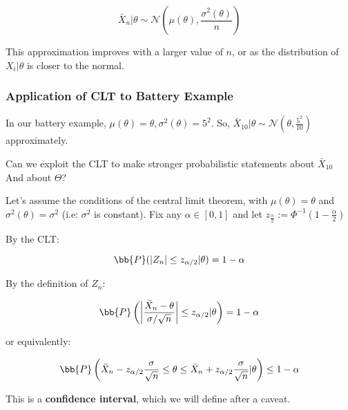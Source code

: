 \documentclass[a4paper]{article}
\begin{document}
                \[
                    \bar X_n | \theta \sim \mathcal{N}\left(\mu(\theta),
                    \frac{\sigma^2(\theta)}{n}\right)
                \]

                This approximation improves with a larger value of $n$, or as
                the distribution of $X_i | \theta$ is closer to the normal.

            \subsubsection{Application of CLT to Battery Example}
                In our battery example, $\mu(\theta) = \theta, \sigma^2(\theta)
                = 5^2$. So, $\bar X_{10} | \theta \sim \mathcal{N}\left(\theta,
                \frac{5^2}{10}\right)$ approximately.

                Can we exploit the CLT to make stronger probabilistic statements
                about $\bar X_{10}$ And about $\Theta$?

                Let's assume the conditions of the central limit theorem, with
                $\mu(\theta) = \theta$ and $\sigma^2(\theta) = \sigma^2$ (i.e:
                $\sigma^2$ is constant). Fix any $\alpha \in [0, 1]$ and let
                $z_\frac{\alpha}{2} := \Phi^{-1}\left(1 -
                \frac{\alpha}{2}\right)$


                By the CLT:

                \[
                    \bb{P}(|Z_n| \leq z_{\alpha/2} | \theta) = 1 - \alpha
                \]

                By the definition of $Z_n$:

                \[
                    \bb{P}\left(\left|\frac{\bar X_n - \theta}{\sigma/\sqrt{n}
                    }\right| \leq z_{\alpha/2} | \theta\right) = 1 - \alpha
                \]

                or equivalently:

                \[
                    \bb{P}\left(\bar X_n - z_{\alpha/2} \frac{\sigma}{\sqrt{n}}
                    \leq \theta \leq \bar X_n + z_{\alpha/2}
                    \frac{\sigma}{\sqrt{n}}|\theta\right) \leq 1 - \alpha
                \]

                This is a \textbf{confidence interval}, which we will define
                after a caveat.
\end{document}
